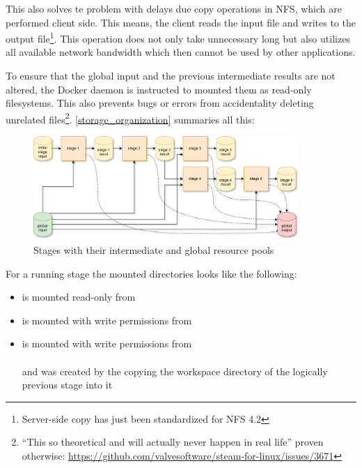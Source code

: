 This also solves te problem with delays due copy operations in NFS, which are performed client side.
This means, the client reads the input file and writes to the output file\footnote{Server-side copy has just been standardized for NFS 4.2\cite{nfs:ssc}}.
This operation does not only take unnecessary long but also utilizes all available network bandwidth which then cannot be used by other applications.

To ensure that the global input and the previous intermediate results are not altered, the Docker daemon is instructed to mounted them as read-only filesystems.
This also prevents bugs or errors from accidentality deleting unrelated files\footnote{\enquote{This so theoretical and will actually never happen in real life} proven otherwise: \url{https://github.com/valvesoftware/steam-for-linux/issues/3671}}.
\autoref{storage_organization} summaries all this:


\begin{figure}[H]
	\centering
	\includegraphics[width=0.9\textwidth]{stage-storage.png}
	\caption{Stages with their intermediate and global resource pools}
	\label{storage_organization}
\end{figure}

For a running stage the mounted directories looks like the following:

\begin{itemize}
	\item {} is mounted read-only from \\ 
	\item {} is mounted with write permissions from \\ 
	\item {} is mounted with write permissions from \\  \\
	and was created by the copying the workspace directory of the logically previous stage into it
\end{itemize}


